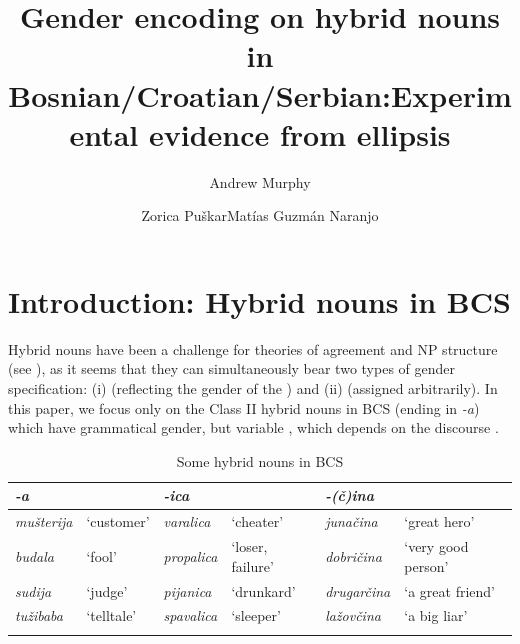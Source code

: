 \documentclass[output=paper,modfonts,newtxmath,hidelinks]{langscibook}
\title{Gender encoding on hybrid nouns in Bosnian\slash Croatian\slash Serbian:\newlineCover Experimental evidence from ellipsis}
\author{Andrew Murphy\affiliation{University of Leipzig}\and  Zorica Puškar\affiliation{Leibniz-Zentrum Allgemeine Sprachwissenschaft, Berlin}\lastand  Matías Guzmán Naranjo\affiliation{Heinrich Heine University Düsseldorf}}
\begin{document}
\maketitle
{}

\section{Introduction: Hybrid nouns in BCS}

Hybrid nouns have been a challenge for theories of agreement and NP structure (see \citealt{corbett91,wandz03,aandalfg,aandalanguage,pesetsky14,kramerbook,Landau2016DPinternalsemantic,smith15,smith16,arsenijevicjuksek,despichybrid17}), as it seems that they can simultaneously bear two types of gender specification: 
(i)  (reflecting the gender of the ) and
(ii)  (assigned arbitrarily). In this paper, we focus only on the Class II hybrid nouns in BCS (ending in \textit{-a}) which have grammatical  gender, but variable , which depends on the discourse .
	

\begin{table}
\caption{Some hybrid nouns in BCS}\label{14:t1}
\small
\begin{tabularx}{\textwidth}{llllll}
\lsptoprule
\textbf{\textit{-a}}&&\textbf{\textit{-ica}}&&\textbf{\textit{-(č)ina}}&\\
\midrule
\textit{mušterija} & `customer' &  \textit{varalica} & `cheater'  & \textit{junačina} & `great hero'\\  
\textit{budala} & `fool'  & \textit{propalica} & `loser, failure' & \textit{dobričina} & `very good person'\\
\textit{sudija} & `judge' & \textit{pijanica} & `drunkard'  & \textit{drugarčina} & `a great friend'\\
\textit{tužibaba} & `telltale' & \textit{spavalica} & `sleeper' & \textit{lažovčina} & `a big liar' \\
\lspbottomrule
\end{tabularx}
\end{table}
\end{document}
